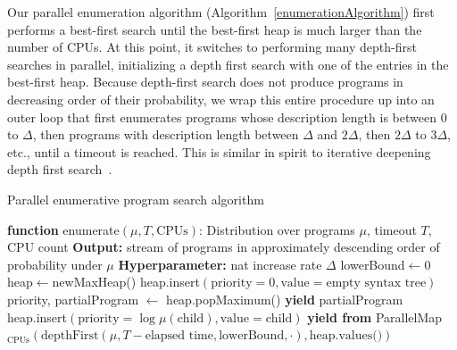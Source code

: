 \documentclass{article}
\begin{document}
Our parallel enumeration algorithm (Algorithm~\ref{enumerationAlgorithm})
first performs a best-first search
until the best-first heap
is much larger than the number of CPUs.
At this point,
it switches to performing many depth-first searches in parallel,
initializing a depth first search
with one of the
entries in the best-first heap.
Because depth-first search does not
produce programs in decreasing order of their probability,
we wrap this entire procedure up into an outer loop
that first enumerates programs whose description length is between
$0$ to $\Delta$,
then programs with description length between $\Delta$ and $2\Delta$,
then $2\Delta$ to $3\Delta$, etc.,
until a timeout is reached.
This is similar in spirit to iterative deepening depth first search~\cite{Russell:2003:AIM:773294}.
 \begin{algorithm}
   \caption{Parallel enumerative program search algorithm }
   \label{enumerationAlgorithm}
   \begin{algorithmic}[1]
     \State \textbf{function} enumerate$(\mu, T, \text{CPUs})$:
      Distribution over programs $\mu$, timeout $T$, CPU count
     \State \textbf{Output:} stream of programs in approximately descending order of probability under $\mu$
     \State \textbf{Hyperparameter:} nat increase rate $\Delta$
     \State lowerBound$\gets 0$
     \State heap$\gets$newMaxHeap()
     \State heap.insert$(\text{priority} = 0,\text{value} = \text{empty syntax tree})$
     \State priority, partialProgram $\gets$ heap.popMaximum()
     \State \textbf{yield }partialProgram
     \EndIf
     \Else
     \State heap.insert$(\text{priority} = \log \mu(\text{child}),\text{value} = \text{child})$
     \EndIf
     \EndFor
     \EndIf
     \EndWhile
     \State \textbf{yield from }ParallelMap$_\text{CPUs}(\text{depthFirst}(\mu,T - \text{elapsed time}, \text{lowerBound}, \cdot ), \text{heap.values()})$%

\end{algorithmic}
\end{algorithm}
\end{document}
